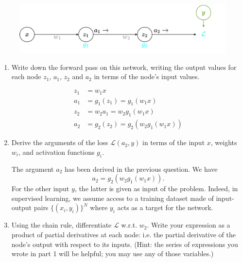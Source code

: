 \documentclass[11pt, a4paper]{article}
\begin{document}
\begin{figure}[h!]
    \centering
    \includegraphics[width=\linewidth]{figures/classif_2.png}
\end{figure}

\begin{enumerate}
    \item Write down the forward pass on this network, writing the output values for each node $z_1$, $a_1$, $z_2$ and $a_2$ in terms of the node’s input values.
    
    \begin{solution}
        \begin{align*}
            z_1 &= w_1 x\\
            a_1 &= g_1(z_1) = g_1(w_1 x)\\
            z_2 &= w_2 a_1 = w_2 g_1(w_1 x)\\
            a_2 &= g_2(z_2) = g_2(w_2 g_1(w_1 x))
        \end{align*}
    \end{solution}
    
    \item Derive the arguments of the loss $\mathcal{L}(a_2, y)$ in terms of the input $x$, weights $w_i$, and activation functions $g_i$.

    \begin{solution}
        The argument $a_2$ has been derived in the previous question. We have 
        $$
        a_2 = g_2(w_2 g_1(w_1 x)).
        $$
        For the other input $y$, the latter is given as input of the problem. Indeed, in supervised learning, we assume access to a training dataset made of input-output pairs $\{(x_i, y_i)\}^N$ where $y_i$ acts as a target for the network.
    \end{solution}

    \item Using the chain rule, differentiate $\mathcal{L}$ w.r.t. $w_2$. Write your expression as a product of partial derivatives at each node: i.e. the partial derivative of the node’s output with respect to its inputs. (Hint: the series of expressions you wrote in part 1 will be helpful; you may use any of those variables.)


\end{enumerate}
\end{document}
